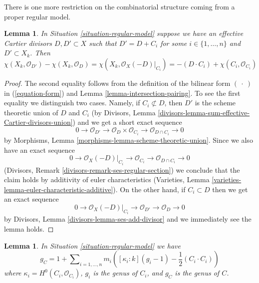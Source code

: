 \documentclass{stacks-project}
\theoremstyle{plain}
\newtheorem{lemma}[subsection]{Lemma}
\theoremstyle{definition}
\theoremstyle{remark}
\numberwithin{equation}{subsection}
\begin{document}
\noindent
There is one more restriction on the combinatorial structure
coming from a proper regular model.

\begin{lemma}
\label{lemma-add-component}
In Situation \ref{situation-regular-model} suppose we have an
effective Cartier divisors $D, D' \subset X$ such that
$D' = D + C_i$ for some $i \in \{1, \ldots, n\}$ and $D' \subset X_k$.
Then
$$
\chi(X_k, \mathcal{O}_{D'}) - \chi(X_k, \mathcal{O}_D) =
\chi(X_k, \mathcal{O}_X(-D)|_{C_i}) =
-(D \cdot C_i) + \chi(C_i, \mathcal{O}_{C_i})
$$
\end{lemma}

\begin{proof}
The second equality follows from the definition of the bilinear form
$(\ \cdot\ )$ in (\ref{equation-form}) and
Lemma \ref{lemma-intersection-pairing}. To see the first
equality we distinguish two cases.
Namely, if $C_i \not \subset D$, then $D'$ is the scheme
theoretic union of $D$ and $C_i$ (by
Divisors, Lemma \ref{divisors-lemma-sum-effective-Cartier-divisors-union})
and we get a short exact sequence
$$
0 \to \mathcal{O}_{D'} \to
\mathcal{O}_D \times \mathcal{O}_{C_i} \to
\mathcal{O}_{D \cap C_i} \to 0
$$
by Morphisms, Lemma \ref{morphisms-lemma-scheme-theoretic-union}.
Since we also have an exact sequence
$$
0 \to \mathcal{O}_X(-D)|_{C_i} \to
\mathcal{O}_{C_i} \to \mathcal{O}_{D \cap C_i} \to 0
$$
(Divisors, Remark \ref{divisors-remark-ses-regular-section})
we conclude that the claim holds
by additivity of euler characteristics
(Varieties, Lemma \ref{varieties-lemma-euler-characteristic-additive}).
On the other hand, if $C_i \subset D$ then we get an
exact sequence
$$
0 \to \mathcal{O}_X(-D)|_{C_i} \to \mathcal{O}_{D'} \to \mathcal{O}_D \to 0
$$
by Divisors, Lemma \ref{divisors-lemma-ses-add-divisor}
and we immediately see the lemma holds.
\end{proof}

\begin{lemma}
\label{lemma-genus-formula}
In Situation \ref{situation-regular-model} we have
$$
g_C = 1 + \sum\nolimits_{i = 1, \ldots, n}
m_i\left([\kappa_i : k] (g_i - 1) - \frac{1}{2}(C_i \cdot C_i)\right)
$$
where $\kappa_i = H^0(C_i, \mathcal{O}_{C_i})$,
$g_i$ is the genus of $C_i$, and $g_C$ is the genus of $C$.
\end{lemma}
\end{document}
